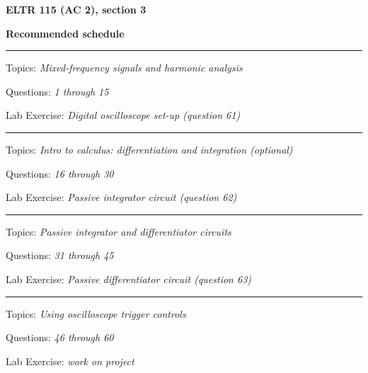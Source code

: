 
\centerline{\bf ELTR 115 (AC 2), section 3} \bigskip 
 
\vskip 10pt

\noindent
{\bf Recommended schedule}

\vskip 5pt

\hrule \vskip 5pt
\noindent
{}

\hskip 10pt Topics: {\it Mixed-frequency signals and harmonic analysis}
 
\hskip 10pt Questions: {\it 1 through 15}
 
\hskip 10pt Lab Exercise: {\it Digital oscilloscope set-up (question 61)}
 




\vskip 10pt
\hrule \vskip 5pt
\noindent
{}

\hskip 10pt Topics: {\it Intro to calculus: differentiation and integration (optional)}
 
\hskip 10pt Questions: {\it 16 through 30}
 
\hskip 10pt Lab Exercise: {\it Passive integrator circuit (question 62)}
 
\vskip 10pt
\hrule \vskip 5pt
\noindent
{}

\hskip 10pt Topics: {\it Passive integrator and differentiator circuits}
 
\hskip 10pt Questions: {\it 31 through 45}
 
\hskip 10pt Lab Exercise: {\it Passive differentiator circuit (question 63)}
 
\vskip 10pt
\hrule \vskip 5pt
\noindent
{}

\hskip 10pt Topics: {\it Using oscilloscope trigger controls}
 
\hskip 10pt Questions: {\it 46 through 60}
 
\hskip 10pt Lab Exercise: {\it work on project}



